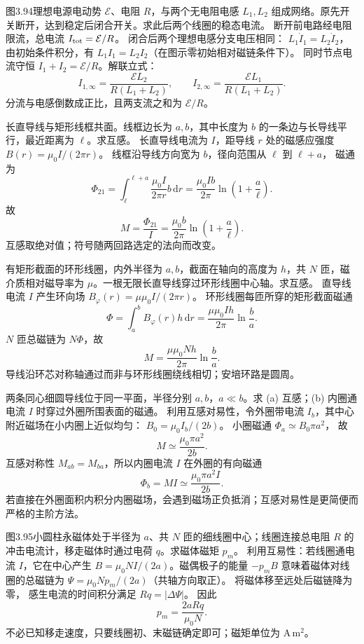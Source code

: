 图3.94理想电源电动势 $\mathcal E$、电阻 $R$，与两个无电阻电感 $L_1,L_2$ 组成网络。原先开关断开，达到稳定后闭合开关。求此后两个线圈的稳态电流。
\exsolution
断开前电路经电阻限流，总电流
$I_{\rm tot}=\mathcal E/R$。
闭合后两个理想电感分支电压相同：
$L_1\dot I_1=L_2\dot I_2$，
由初始条件积分，有
$L_1I_1=L_2I_2$（在图示零初始相对磁链条件下）。
同时节点电流守恒
$I_1+I_2=\mathcal E/R$。解联立式：
\[
\boxed{I_{1,\infty}=
\frac{\mathcal E L_2}{R(L_1+L_2)},\qquad
I_{2,\infty}=
\frac{\mathcal E L_1}{R(L_1+L_2)}}.
\]
\excheck 分流与电感倒数成正比，且两支流之和为 $\mathcal E/R$。

长直导线与矩形线框共面。线框边长为 $a,b$，其中长度为 $b$ 的一条边与长导线平行，最近距离为 $\ell$。求互感。
\exsolution
长直导线电流为 $I$，距导线 $r$ 处的磁感应强度
$B(r)=\mu_0I/(2\pi r)$。
线框沿导线方向宽为 $b$，径向范围从 $\ell$ 到 $\ell+a$，
磁通为
\[
\Phi_{21}=\int_\ell^{\ell+a}
\frac{\mu_0I}{2\pi r}b\,\mathrm dr
=\frac{\mu_0Ib}{2\pi}
\ln\left(1+\frac a\ell\right).
\]
故
\[
\boxed{M=\frac{\Phi_{21}}I
=\frac{\mu_0b}{2\pi}\ln\left(1+\frac a\ell\right)}.
\]
\excheck 互感取绝对值；符号随两回路选定的法向而改变。

有矩形截面的环形线圈，内外半径为 $a,b$，截面在轴向的高度为 $h$，共 $N$ 匝，磁介质相对磁导率为 $\mu$。一根无限长直导线穿过环形线圈中心轴。求互感。
\exsolution
直导线电流 $I$ 产生环向场
$B_\varphi(r)=\mu\mu_0I/(2\pi r)$。
环形线圈每匝所穿的矩形截面磁通
\[
\Phi=\int_a^bB_\varphi(r)h\,\mathrm dr
=\frac{\mu\mu_0Ih}{2\pi}\ln\frac ba.
\]
$N$ 匝总磁链为 $N\Phi$，故
\[
\boxed{M=\frac{\mu\mu_0Nh}{2\pi}\ln\frac ba}.
\]
\excheck 导线沿环芯对称轴通过而非与环形线圈绕线相切；安培环路是圆周。

两条同心细圆导线位于同一平面，半径分别 $a,b$，$a\ll b$。求 (a) 互感；(b) 内圈通电流 $I$ 时穿过外圈所围表面的磁通。
\exsolution
利用互感对易性，令外圈带电流 $I_b$，其中心附近磁场在小内圈上近似均匀：
$B_0=\mu_0I_b/(2b)$。
小圈磁通
$\Phi_a\simeq B_0\pi a^2$，
故
\[
\boxed{M\simeq\frac{\mu_0\pi a^2}{2b}}.
\]
互感对称性 $M_{ab}=M_{ba}$，所以内圈电流 $I$ 在外圈的有向磁通
\[
\boxed{\Phi_b=MI\simeq\frac{\mu_0\pi a^2I}{2b}}.
\]
\excheck 若直接在外圈面积内积分内圈磁场，会遇到磁场正负抵消；互感对易性是更简便而严格的主阶方法。

图3.95小圆柱永磁体处于半径为 $a$、共 $N$ 匝的细线圈中心；线圈连接总电阻 $R$ 的冲击电流计，移走磁体时通过电荷 $q$。求磁体磁矩 $p_m$。
\exsolution
利用互易性：若线圈通电流 $I$，它在中心产生
$B=\mu_0NI/(2a)$。磁偶极子的能量 $-p_mB$ 意味着磁体对线圈的总磁链为
$\Psi=\mu_0Np_m/(2a)$（共轴方向取正）。
将磁体移至远处后磁链降为零，
感生电流的时间积分满足
$Rq=|\Delta\Psi|$。
因此
\[
\boxed{p_m=\frac{2aRq}{\mu_0N}}.
\]
\excheck 不必已知移走速度，只要线圈初、末磁链确定即可；磁矩单位为 $\mathrm{A\,m^2}$。

